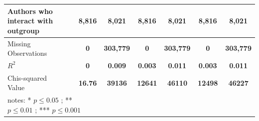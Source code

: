 \documentclass[letterpaper]{article}
\begin{document}
\begin{table}
\begin{threeparttable}
\begin{adjustbox}{max width=\textwidth}
\begin{tabular}{|p{3.75cm}|c|cccc|cccc|cccc|cccc|cccc|cccc|}
    Authors who interact with outgroup &       & \multicolumn{4}{c|}{\textbf{8,816}} & \multicolumn{4}{c|}{\textbf{8,021}} & \multicolumn{4}{c|}{\textbf{8,816}} & \multicolumn{4}{c|}{\textbf{8,021}} & \multicolumn{4}{c|}{\textbf{8,816}} & \multicolumn{4}{c|}{\textbf{8,021}} \\\hline
    Missing Observations &       & \multicolumn{4}{c|}{\textbf{0}} & \multicolumn{4}{c|}{\textbf{303,779}} & \multicolumn{4}{c|}{\textbf{0}} & \multicolumn{4}{c|}{\textbf{303,779}} & \multicolumn{4}{c|}{\textbf{0}} & \multicolumn{4}{c|}{\textbf{303,779}} \\\hline
    $R^2$ &       & \multicolumn{4}{c|}{\textbf{0}} & \multicolumn{4}{c|}{\textbf{0.009}} & \multicolumn{4}{c|}{\textbf{0.003}} & \multicolumn{4}{c|}{\textbf{0.011}} & \multicolumn{4}{c|}{\textbf{0.003}} & \multicolumn{4}{c|}{\textbf{0.011}} \\\hline
    Chis-squared Value &       & \multicolumn{4}{c|}{\textbf{16.76}} & \multicolumn{4}{c|}{\textbf{39136}} & \multicolumn{4}{c|}{\textbf{12641}} & \multicolumn{4}{c|}{\textbf{46110}} & \multicolumn{4}{c|}{\textbf{12498}} & \multicolumn{4}{c|}{\textbf{46227}} \\\hline
    
\multicolumn{3}{l}{notes: * $p \leq 0.05$ ; ** $p \leq 0.01$ ; *** $p \leq 0.001$}{}&
\multicolumn{5}{l}{}&
\multicolumn{5}{l}{}&
\multicolumn{5}{l}{}\\
    \end{tabular}%

\end{adjustbox}
\end{threeparttable}
\label{tab:regrtab2}
\end{table}
\end{document}
